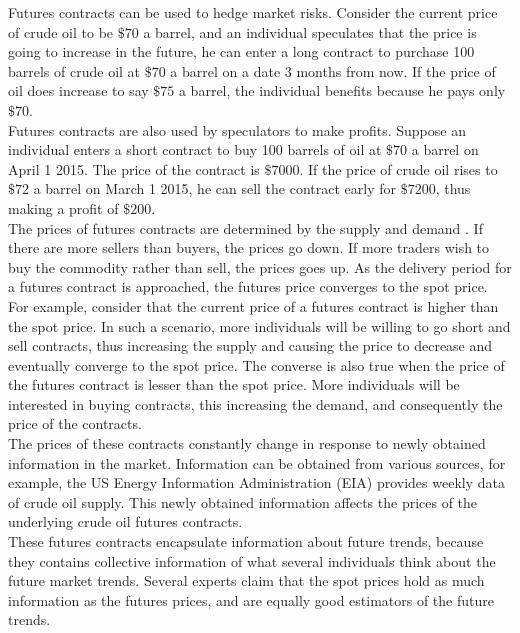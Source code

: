 \documentclass[runningheads]{llncs}
\begin{document}
\noindent Futures contracts can be used to hedge market risks. Consider the current price of crude oil to be $\$70$ a barrel, and an individual speculates that the price is going to increase in the future, he can enter a long contract to purchase 100 barrels of crude oil at $\$70$ a barrel on a date 3 months from now. If the price of oil does increase to say $\$75$ a barrel, the individual benefits because he pays only $\$70$.\\

\noindent Futures contracts are also used by speculators to make profits. Suppose an individual enters a short contract to buy 100 barrels of oil at $\$70$ a barrel on April 1 2015. The price of the contract is $\$7000$. If the price of crude oil rises to $\$72$ a barrel on March 1 2015, he can sell the contract early for $\$7200$, thus making a profit of $\$200$. \\

\noindent The prices of futures contracts are determined by the supply and demand \cite{futuresbook}. If there are more sellers than buyers, the prices go down. If more traders wish to buy the commodity rather than sell, the prices goes up. As the delivery period for a futures contract is approached, the futures price converges to the spot price. For example, consider that the current price of a futures contract is higher than the spot price. In such a scenario, more individuals will be willing to go short and sell contracts, thus increasing the supply and causing the price to decrease and eventually converge to the spot price. The converse is also true when the price of the futures contract is lesser than the spot price. More individuals will be interested in buying contracts, this increasing the demand, and consequently the price of the contracts. \\
 
\noindent The prices of these contracts constantly change in response to newly obtained information in the market. Information can be obtained from various sources, for example, the US Energy Information Administration (EIA) provides weekly data of crude oil supply. This newly obtained information affects the prices of the underlying crude oil futures contracts. \\

\noindent These futures contracts encapsulate information about future trends, because they contains collective information of what several individuals think about the future market trends. Several experts claim that the spot prices hold as much information as the futures prices, and are equally good estimators of the future trends. 
\end{document}
